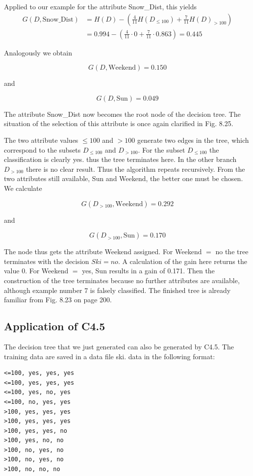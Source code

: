 \documentclass[10pt]{book}
\begin{document}
Applied to our example for the attribute Snow\_Dist, this yields
$$
\begin{aligned}
G(D, \text{Snow\_Dist}) & = H(D) - \left(\frac{4}{11} H\left(D_{\leq 100}\right) + \frac{7}{11} H(D)_{>100}\right) \\
& = 0.994 - \left(\frac{4}{11} \cdot 0 + \frac{7}{11} \cdot 0.863\right) = 0.445
\end{aligned}
$$

Analogously we obtain

$$
G(D, \text{Weekend})=0.150
$$

and

$$
G(D, \text{Sun})=0.049
$$

The attribute Snow\_Dist now becomes the root node of the decision tree. The situation of the selection of this attribute is once again clarified in Fig. 8.25.

The two attribute values $\leq 100$ and $>100$ generate two edges in the tree, which correspond to the subsets $D_{\leq 100}$ and $D_{>100}$. For the subset $D_{\leq 100}$ the classification is clearly yes. thus the tree terminates here. In the other branch $D_{>100}$ there is no clear result. Thus the algorithm repeats recursively. From the two attributes still available, Sun and Weekend, the better one must be chosen. We calculate

$$
G\left(D_{>100}, \text{Weekend}\right)=0.292
$$

and

$$
G\left(D_{>100}, \text{Sun}\right)=0.170
$$

The node thus gets the attribute Weekend assigned. For Weekend $=$ no the tree terminates with the decision $Ski=no$. A calculation of the gain here returns the value 0. For Weekend $=$ yes, Sun results in a gain of 0.171. Then the construction of the tree terminates because no further attributes are available, although example number 7 is falsely classified. The finished tree is already familiar from Fig. 8.23 on page 200.

\subsection{Application of C4.5}
The decision tree that we just generated can also be generated by C4.5. The training data are saved in a data file ski. data in the following format:

\begin{verbatim}
<=100, yes, yes, yes
<=100, yes, yes, yes
<=100, yes, no, yes
<=100, no, yes, yes
>100, yes, yes, yes
>100, yes, yes, yes
>100, yes, yes, no
>100, yes, no, no
>100, no, yes, no
>100, no, yes, no
>100, no, no, no
\end{verbatim}
\end{document}
